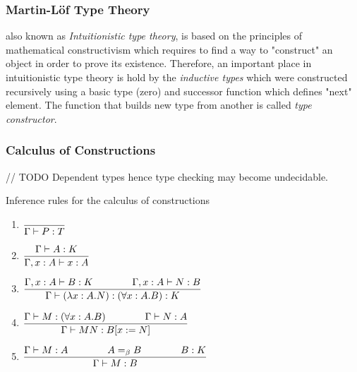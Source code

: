 \documentclass[article]{aaltoseries}
\begin{document}

\subsubsection{Martin-Löf Type Theory}
also known as \textit{Intuitionistic type theory}, is based on the principles of mathematical constructivism which requires to find a way to "construct" an object in order to prove its existence. Therefore, an important place in intuitionistic type theory is hold by the \textit{inductive types} which were constructed recursively using a basic type (zero) and successor function which defines "next" element. The function that builds new type from another is called \textit{type constructor}.

\subsubsection{Calculus of Constructions}
// TODO
Dependent types
hence type checking may become undecidable.

Inference rules for the calculus of constructions
\begin{enumerate}
	\item ${\displaystyle {{} \over {}\Gamma \vdash P:T}}$
	\item ${\displaystyle {\Gamma \vdash A:K \over {\Gamma ,x:A\vdash x:A}}}$ %
	\item ${\displaystyle {\Gamma ,x:A\vdash B:K\qquad \qquad \Gamma ,x:A\vdash N:B \over {\Gamma \vdash (\lambda x:A.N):(\forall x:A.B):K}}}$
	\item ${\displaystyle {\Gamma \vdash M:(\forall x:A.B)\qquad \qquad \Gamma \vdash N:A \over {\Gamma \vdash MN:B[x:=N]}}}$
	\item ${\displaystyle {\Gamma \vdash M:A\qquad \qquad A=_{\beta }B\qquad \qquad B:K \over {\Gamma \vdash M:B}}}$ %
\end{enumerate}
\end{document}
